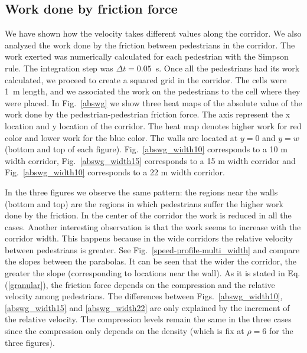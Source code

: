 \subsection{Work done by friction force}


We have shown how the velocity takes different values along the corridor. We also analyzed the work done by the friction between pedestrians in the corridor. The work exerted was numerically calculated for each pedestrian with the Simpson rule. The integration step was $\Delta t = 0.05$~s. Once all the pedestrians had its work calculated, we proceed to create a squared grid in the corridor. The cells were 1~m length, and we associated the work on the pedestrians to the cell where they were placed.  In Fig.~\ref{abswg} we show three heat maps of the absolute value of the work done by the pedestrian-pedestrian friction force. The axis represent the x location and y location of the corridor. The heat map denotes higher work for red color and lower work for the blue color. The walls are located at $y=0$ and $y=w$ (bottom and top of each figure). Fig.~\ref{abswg_width10} corresponds to a 10 m width corridor, Fig.~\ref{abswg_width15} corresponds to a 15 m width corridor and  Fig.~\ref{abswg_width10} corresponds to a 22 m width corridor.

In the three figures we observe the same pattern: the regions near the walls (bottom and top) are the regions in which pedestrians suffer the higher work done by the friction. In the center of the corridor the work is reduced in all the cases. Another interesting observation is that the work seems to increase with the corridor width. This happens because in the wide corridors the relative velocity between pedestrians is greater. See Fig.~\ref{speed-profile-multi_width} and compare the slopes between the parabolas. It can be seen that the wider the corridor, the greater the slope (corresponding to locations near the wall). As it is stated in Eq.(\ref{granular}), the friction force depends on the compression and the relative velocity among pedestrians. The differences between Figs.~\ref{abswg_width10}, \ref{abswg_width15} and  \ref{abswg_width22}  are only explained by the increment of the relative velocity. The compression levels remain the same in the three cases since the compression only depends on the density (which is fix at $\rho=6$ for the three figures).


